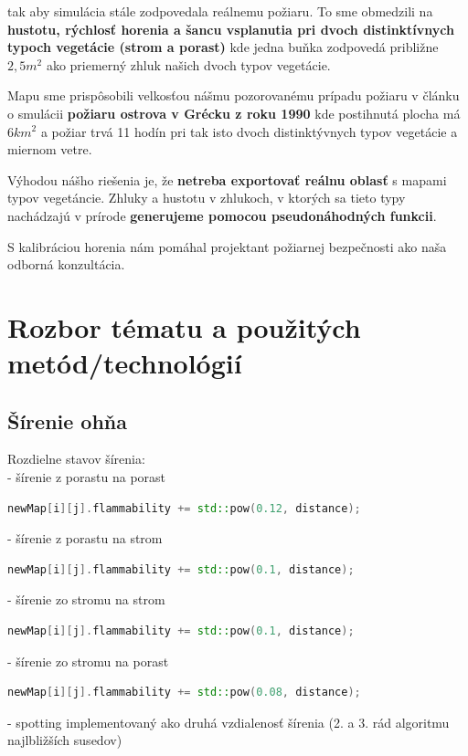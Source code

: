 \documentclass[a4paper,12pt]{article}
\begin{document}
tak aby simulácia stále zodpovedala reálnemu požiaru. 
To sme obmedzili na \textbf{hustotu, rýchlosť horenia a šancu vsplanutia pri dvoch distinktívnych typoch 
vegetácie (strom a porast)} kde jedna buňka zodpovedá približne $2,5m^{2}$
ako priemerný zhluk našich dvoch typov vegetácie. 
\\
\par Mapu sme prispôsobili velkosťou nášmu pozorovanému 
prípadu požiaru v článku o smulácii \textbf{požiaru ostrova v Grécku z roku 1990} \cite{CAmodel4FF}
kde postihnutá plocha má $6km^{2}$ a požiar trvá 11 hodín pri tak isto dvoch distinktývnych typov vegetácie a miernom vetre.
\\
\par Výhodou nášho riešenia je, že \textbf{netreba exportovať reálnu oblasť} s mapami typov vegetáncie.
Zhluky a hustotu v zhlukoch, v ktorých sa tieto typy nachádzajú v prírode \textbf{generujeme pomocou pseudonáhodných funkcii}.
\\
\par S kalibráciou horenia nám pomáhal projektant požiarnej bezpečnosti ako naša odborná konzultácia. 

\newpage


\section{Rozbor tématu a použitých metód/technológií}

\subsection{Šírenie ohňa}
Rozdielne stavov šírenia: \\
- šírenie z porastu na porast 
\begin{lstlisting}[language=C++]
newMap[i][j].flammability += std::pow(0.12, distance); 
\end{lstlisting}
- šírenie z porastu na strom 
\begin{lstlisting}[language=C++]
newMap[i][j].flammability += std::pow(0.1, distance); 
\end{lstlisting}
- šírenie zo stromu na strom 
\begin{lstlisting}[language=C++] 
newMap[i][j].flammability += std::pow(0.1, distance); 
\end{lstlisting}
- šírenie zo stromu na porast 
\begin{lstlisting}[language=C++]
newMap[i][j].flammability += std::pow(0.08, distance); 
\end{lstlisting}
- spotting implementovaný ako druhá vzdialenosť šírenia (2. a 3. rád algoritmu najlbližších susedov)
\end{document}
